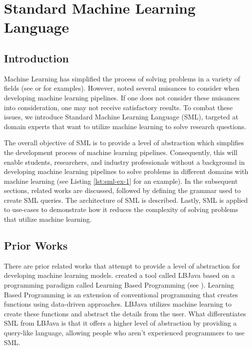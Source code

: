 \chapter{Standard Machine Learning Language} \label{Chapter:SML}

\section{Introduction}
\label{Introduction}

Machine Learning has simplified the process of solving problems in a variety of fields (see \cite{ML-UseCase1} or \cite{Monahan} for examples).  However, \cite{pedros:fewUsefulThings} noted several nuisances to consider when developing machine learning pipelines.  If one does not consider these nuisances into consideration, one may not receive satisfactory results.  To combat these issues, we introduce Standard Machine Learning Language (SML), targeted at domain experts that want to utilize machine learning to solve research questions.

The overall objective of SML is to provide a level of abstraction which simplifies the development process of machine learning pipelines.  Consequently, this will enable students, researchers, and industry professionals without a background in developing machine learning pipelines to solve problems in different domains with machine learning (see Listing \ref{lst:sml-ex-1} for an example).  In the subsequent sections, related works are discussed,  followed by defining the grammar used to create SML queries. The architecture of SML is described. Lastly, SML is applied to use-cases to demonstrate how it reduces the complexity of solving problems that utilize machine learning.

\section{Prior Works}
\label{SML:PriorWorks}

There are prior related works that attempt to provide a level of abstraction for developing machine learning models.  \cite{RizzoloRo10} created a tool called LBJava based on a programming paradigm called Learning Based Programming (see \cite{Roth05}). Learning Based Programming is an extension of conventional programming that creates functions using data-driven approaches.  LBJava utilizes machine learning to create these functions and abstract the details from the user.  What differentiates SML from LBJava is that it offers a higher level of abstraction by providing a query-like language, allowing people who aren't experienced programmers to use SML.  

